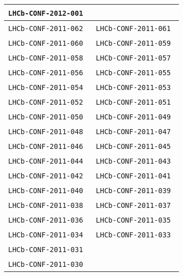 \begin{center}
\begin{longtable}{ll}
\texttt{LHCb-CONF-2012-001}~\cite{LHCb-CONF-2012-001} \\
\hline
\texttt{LHCb-CONF-2011-062}~\cite{LHCb-CONF-2011-062} &
\texttt{LHCb-CONF-2011-061}~\cite{LHCb-CONF-2011-061} \\ 
\texttt{LHCb-CONF-2011-060}~\cite{LHCb-CONF-2011-060} &
\texttt{LHCb-CONF-2011-059}~\cite{LHCb-CONF-2011-059} \\
\texttt{LHCb-CONF-2011-058}~\cite{LHCb-CONF-2011-058} & 
\texttt{LHCb-CONF-2011-057}~\cite{LHCb-CONF-2011-057} \\
\texttt{LHCb-CONF-2011-056}~\cite{LHCb-CONF-2011-056} & 
\texttt{LHCb-CONF-2011-055}~\cite{LHCb-CONF-2011-055} \\ 
\texttt{LHCb-CONF-2011-054}~\cite{LHCb-CONF-2011-054} &
\texttt{LHCb-CONF-2011-053}~\cite{LHCb-CONF-2011-053} \\ 
\texttt{LHCb-CONF-2011-052}~\cite{LHCb-CONF-2011-052} &
\texttt{LHCb-CONF-2011-051}~\cite{LHCb-CONF-2011-051} \\ 
\texttt{LHCb-CONF-2011-050}~\cite{LHCb-CONF-2011-050} &
\texttt{LHCb-CONF-2011-049}~\cite{LHCb-CONF-2011-049} \\
\texttt{LHCb-CONF-2011-048}~\cite{LHCb-CONF-2011-048} & 
\texttt{LHCb-CONF-2011-047}~\cite{LHCb-CONF-2011-047} \\
\texttt{LHCb-CONF-2011-046}~\cite{LHCb-CONF-2011-046} & 
\texttt{LHCb-CONF-2011-045}~\cite{LHCb-CONF-2011-045} \\ 
\texttt{LHCb-CONF-2011-044}~\cite{LHCb-CONF-2011-044} &
\texttt{LHCb-CONF-2011-043}~\cite{LHCb-CONF-2011-043} \\ 
\texttt{LHCb-CONF-2011-042}~\cite{LHCb-CONF-2011-042} &
\texttt{LHCb-CONF-2011-041}~\cite{LHCb-CONF-2011-041} \\ 
\texttt{LHCb-CONF-2011-040}~\cite{LHCb-CONF-2011-040} &
\texttt{LHCb-CONF-2011-039}~\cite{LHCb-CONF-2011-039} \\
\texttt{LHCb-CONF-2011-038}~\cite{LHCb-CONF-2011-038} &
\texttt{LHCb-CONF-2011-037}~\cite{LHCb-CONF-2011-037} \\
\texttt{LHCb-CONF-2011-036}~\cite{LHCb-CONF-2011-036} &
\texttt{LHCb-CONF-2011-035}~\cite{LHCb-CONF-2011-035} \\
\texttt{LHCb-CONF-2011-034}~\cite{LHCb-CONF-2011-034} &
\texttt{LHCb-CONF-2011-033}~\cite{LHCb-CONF-2011-033} \\
\texttt{LHCb-CONF-2011-031}~\cite{LHCb-CONF-2011-031} \\
\texttt{LHCb-CONF-2011-030}~\cite{LHCb-CONF-2011-030} &

\end{longtable}
\end{center}
